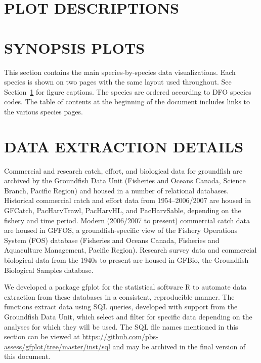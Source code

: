 \documentclass[11pt]{book}\usepackage[]{graphicx}\usepackage[]{color}
\begin{document}
\clearpage

\section{PLOT DESCRIPTIONS} \label{sec:doc-background}


\clearpage

\section{SYNOPSIS PLOTS} \label{sec:plot-pages}

This section contains the main species-by-species data visualizations. Each
species is shown on two pages with the same layout used throughout. See
Section~\ref{sec:doc-background} for figure captions. The species are ordered
according to DFO species codes.
The table of contents at the beginning of the document includes links to the
various species pages.


\clearpage

\section{DATA EXTRACTION DETAILS} \label{sec:data}


Commercial and research catch, effort, and biological data for groundfish are
archived by the Groundfish Data Unit (Fisheries and Oceans Canada, Science
Branch, Pacific Region) and housed in a number of relational databases.
Historical commercial catch and effort data from 1954--2006/2007 are housed in
GFCatch, PacHarvTrawl, PacHarvHL, and PacHarvSable, depending on the fishery and
time period. Modern (2006/2007 to present) commercial catch data are housed in
GFFOS, a groundfish-specific view of the Fishery Operations System (FOS)
database (Fisheries and Oceans Canada, Fisheries and Aquaculture Management,
Pacific Region). Research survey data and commercial biological data from the
1940s to present are housed in GFBio, the Groundfish Biological Samples
database.

We developed a package gfplot for the statistical software R to automate data
extraction from these databases in a consistent, reproducible manner. The
functions extract data using SQL queries, developed with support from the
Groundfish Data Unit, which select and filter for specific data depending on the
analyses for which they will be used. The SQL file names mentioned in this
section can be viewed at
\url{https://github.com/pbs-assess/gfplot/tree/master/inst/sql} and may be
archived in the final version of this document.
\end{document}
